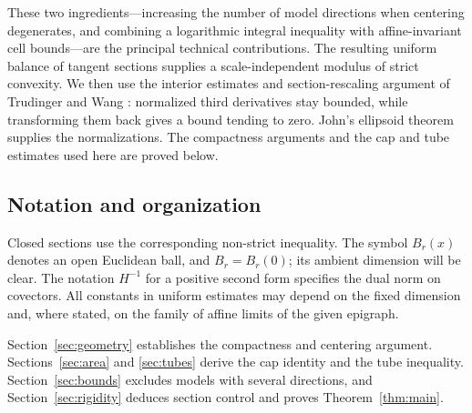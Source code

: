 \documentclass[11pt]{amsart}
\theoremstyle{definition}
\theoremstyle{remark}
\numberwithin{equation}{section}
\begin{document}
These two ingredients---increasing the number of model directions
when centering degenerates, and combining a logarithmic integral
inequality with affine-invariant cell bounds---are the principal
technical contributions. The resulting uniform balance of tangent
sections supplies a scale-independent modulus of strict convexity.
We then use the interior estimates and section-rescaling argument of
Trudinger and Wang \cite[Sections~2 and~4]{TW2000}: normalized third
derivatives stay bounded, while transforming them back gives a bound
tending to zero. John's ellipsoid theorem \cite{John1948,Ball1992}
supplies the normalizations. The compactness arguments and the cap and
tube estimates used here are proved below.

\subsection*{Notation and organization}
Closed sections use the corresponding non-strict inequality.
The symbol \(B_r(x)\) denotes an open Euclidean ball, and \(B_r=B_r(0)\);
its ambient dimension will be clear. The notation \(H^{-1}\)
for a positive second form specifies the dual norm on covectors.
All constants in uniform estimates may depend on the fixed dimension
and, where stated, on the family of affine limits of the given
epigraph.

Section~\ref{sec:geometry} establishes the compactness and centering
argument. Sections~\ref{sec:area} and \ref{sec:tubes} derive the cap
identity and the tube inequality. Section~\ref{sec:bounds} excludes
models with several directions, and Section~\ref{sec:rigidity}
deduces section control and proves Theorem~\ref{thm:main}.









\end{document}

